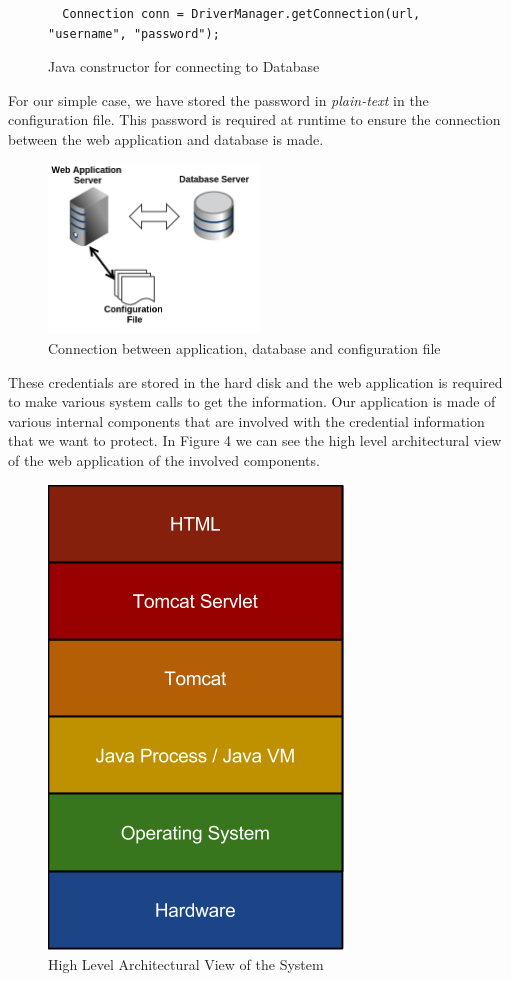 \documentclass[11pt, a4paper, twoside, openright, notitlepage]{report}
\begin{document}
\begin{figure}[!ht]
\begin{lstlisting}
  Connection conn = DriverManager.getConnection(url, "username", "password");
\end{lstlisting} 
\caption{Java constructor for connecting to Database}
\end{figure}

For our simple case, we have stored the password in \emph{plain-text} in the configuration file. This password is required at runtime to ensure the connection between the web application and database is made. \\

\begin{figure}[!ht]
    \centering
    \includegraphics[width=0.5\textwidth]{config}
    \caption{Connection between application, database and configuration file}
\end{figure}

These credentials are stored in the hard disk and the web application is required to make various system calls to get the information. Our application is made of various internal components that are involved with the credential  information that we want to protect. In Figure 4 we can see the high level architectural view of the web application of the involved components. 

\begin{figure}[h!]
    \centering
    \includegraphics[height=0.2\paperheight]{high-level-archecuture}
    \caption{High Level Architectural View of the System}
\end{figure}
\end{document}
